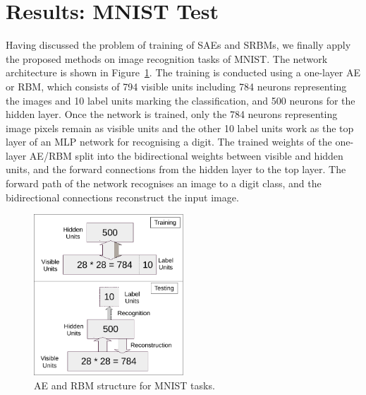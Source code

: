 \section{Results: MNIST Test}
Having discussed the problem of training of SAEs and SRBMs, we finally apply the proposed methods on image recognition tasks of MNIST.
The network architecture is shown in Figure~\ref{fig:MNSIT}.
The training is conducted using a one-layer AE or RBM, which consists of 794 visible units including 784 neurons representing the images and 10 label units marking the classification, and 500 neurons for the hidden layer.
Once the network is trained, only the 784 neurons representing image pixels remain as visible units and the other 10 label units work as the top layer of an MLP network for recognising a digit.
The trained weights of the one-layer AE/RBM split into the bidirectional weights between visible and hidden units, and the forward connections from the hidden layer to the top layer.
The forward path of the network recognises an image to a digit class, and the bidirectional connections reconstruct the input image.

\begin{figure}
	\centering
	\includegraphics[width=0.5\textwidth]{pics_sdlm/mnist.pdf}
	\caption{AE and RBM structure for MNIST tasks.}
	\label{fig:MNSIT}
\end{figure}

